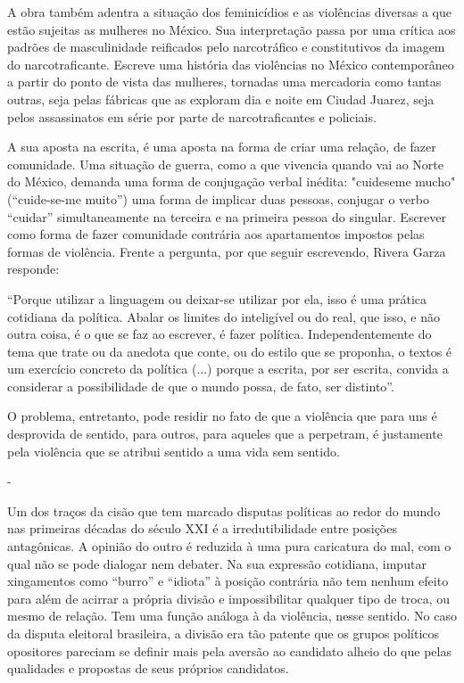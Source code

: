 A obra também adentra a situação dos feminicídios e as violências
diversas a que estão sujeitas as mulheres no México. Sua interpretação
passa por uma crítica aos padrões de masculinidade reificados pelo
narcotráfico e constitutivos da imagem do narcotraficante. Escreve uma
história das violências no México contemporâneo a partir do ponto de
vista das mulheres, tornadas uma mercadoria como tantas outras, seja
pelas fábricas que as exploram dia e noite em Ciudad Juarez, seja pelos
assassinatos em série por parte de narcotraficantes e policiais.

A sua aposta na escrita, é uma aposta na forma de criar uma relação, de
fazer comunidade. Uma situação de guerra, como a que vivencia quando vai
ao Norte do México, demanda uma forma de conjugação verbal inédita:
"cuideseme mucho" (``cuide-se-me muito'') uma forma de implicar duas
pessoas, conjugar o verbo ``cuidar'' simultaneamente na terceira e na
primeira pessoa do singular. Escrever como forma de fazer comunidade
contrária aos apartamentos impostos pelas formas de violência. Frente a
pergunta, por que seguir escrevendo, Rivera Garza responde:

``Porque utilizar a linguagem ou deixar-se utilizar por ela, isso é uma
prática cotidiana da política. Abalar os limites do inteligível ou do
real, que isso, e não outra coisa, é o que se faz ao escrever, é fazer
política. Independentemente do tema que trate ou da anedota que conte,
ou do estilo que se proponha, o textos é um exercício concreto da
política (...) porque a escrita, por ser escrita, convida a considerar a
possibilidade de que o mundo possa, de fato, ser distinto''.

O problema, entretanto, pode residir no fato de que a violência que para
uns é desprovida de sentido, para outros, para aqueles que a perpetram,
é justamente pela violência que se atribui sentido a uma vida sem
sentido.

-

Um dos traços da cisão que tem marcado disputas políticas ao redor do
mundo nas primeiras décadas do século XXI é a irredutibilidade entre
posições antagônicas. A opinião do outro é reduzida à uma pura
caricatura do mal, com o qual não se pode dialogar nem debater. Na sua
expressão cotidiana, imputar xingamentos como ``burro'' e ``idiota'' à
posição contrária não tem nenhum efeito para além de acirrar a própria
divisão e impossibilitar qualquer tipo de troca, ou mesmo de relação.
Tem uma função análoga à da violência, nesse sentido. No caso da disputa
eleitoral brasileira, a divisão era tão patente que os grupos políticos
opositores pareciam se definir mais pela aversão ao candidato alheio do
que pelas qualidades e propostas de seus próprios candidatos.

